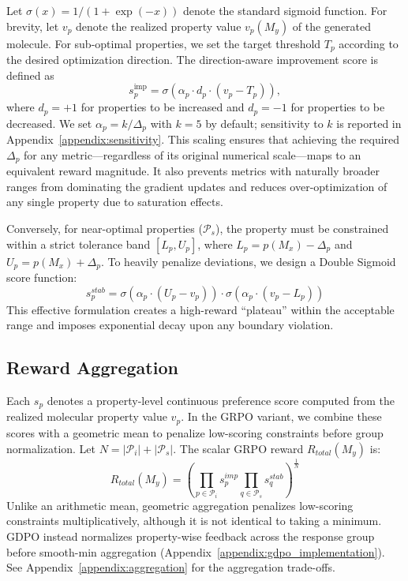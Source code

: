 \documentclass[11pt]{article}
\begin{document}
Let $\sigma(x) = 1 / (1 + \exp(-x))$ denote the standard sigmoid function. For brevity, let $v_p$ denote the realized property value $v_p(M_y)$ of the generated molecule. For sub-optimal properties, we set the target threshold $T_p$ according to the desired optimization direction. 
The direction-aware improvement score is defined as
\[
s_p^{\mathrm{imp}}
=
\sigma\left(\alpha_p \cdot d_p \cdot (v_p - T_p)\right),
\]
where $d_p=+1$ for properties to be increased and $d_p=-1$ for properties to be decreased. We set $\alpha_p=k/\Delta_p$ with $k=5$ by default; sensitivity to $k$ is reported in Appendix~\ref{appendix:sensitivity}. This scaling ensures that achieving the required $\Delta_p$ for any metric---regardless of its original numerical scale---maps to an equivalent reward magnitude. It also prevents metrics with naturally broader ranges from dominating the gradient updates and reduces over-optimization of any single property due to saturation effects.

Conversely, for near-optimal properties ($\mathcal{P}_s$), the property must be constrained within a strict tolerance band $[L_p, U_p]$, where $L_p = p(M_x) - \Delta_p$ and $U_p = p(M_x) + \Delta_p$. To heavily penalize deviations, we design a Double Sigmoid score function:
\begin{equation}
  \label{eq:double_sigmoid}
  s^{stab}_p = \sigma(\alpha_p \cdot (U_p - v_p)) \cdot \sigma(\alpha_p \cdot (v_p - L_p))
\end{equation}
This effective formulation creates a high-reward ``plateau'' within the acceptable range and imposes exponential decay upon any boundary violation.
\subsection{Reward Aggregation}
Each $s_p$ denotes a property-level continuous preference score computed from the realized molecular property value $v_p$. In the GRPO variant, we combine these scores with a geometric mean to penalize low-scoring constraints before group normalization. Let $N = |\mathcal{P}_i| + |\mathcal{P}_s|$. The scalar GRPO reward $R_{total}(M_y)$ is:
\begin{equation}
  \label{eq:geometric_mean}
  R_{total}(M_y) = \left( \prod_{p \in \mathcal{P}_i} s^{imp}_p \prod_{q \in \mathcal{P}_s} s^{stab}_q \right)^{\frac{1}{N}}
\end{equation}
Unlike an arithmetic mean, geometric aggregation penalizes low-scoring constraints multiplicatively, although it is not identical to taking a minimum. GDPO instead normalizes property-wise feedback across the response group before smooth-min aggregation (Appendix~\ref{appendix:gdpo_implementation}). See Appendix~\ref{appendix:aggregation} for the aggregation trade-offs.
\end{document}
